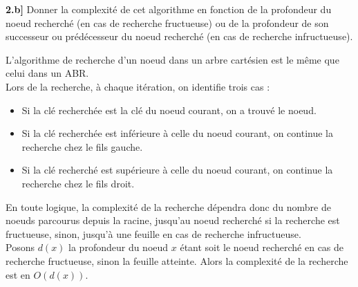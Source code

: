 \documentclass[a4paper,12pt]{report}
\begin{document}
\vspace{1.5cm}

\textbf{2.b]} Donner la complexité de cet algorithme en fonction de la profondeur du noeud recherché (en cas de recherche fructueuse) ou de la profondeur 
    de son successeur ou prédécesseur du noeud recherché (en cas de recherche infructueuse).



\begin{tcolorbox}[colback=gray!10, colframe=blue!30, coltitle=black, title=Réponse à la 2.b - 1/2]

    L'algorithme de recherche d'un noeud dans un arbre cartésien est le même que celui dans un ABR.\\

    Lors de la recherche, à chaque itération, on identifie trois cas :\\[-0.4cm]
    \begin{itemize}
        \item Si la clé recherchée est la clé du noeud courant, on a trouvé le noeud.
        \item Si la clé recherchée est inférieure à celle du noeud courant, on continue la recherche chez le fils gauche.
        \item Si la clé recherché est supérieure à celle du noeud courant, on continue la recherche chez le fils droit.
    \end{itemize}

    \vspace{0.5cm}

    En toute logique, la complexité de la recherche dépendra donc du nombre de noeuds parcourus depuis la racine, jusqu'au noeud recherché si la recherche 
        est fructueuse, sinon, jusqu'à une feuille en cas de recherche infructueuse.\\

    Posons \( d(x) \) la profondeur du noeud \( x \) étant soit le noeud recherché en cas de recherche fructueuse, sinon la feuille atteinte. Alors la 
        complexité de la recherche est en \( O(d(x)) \).\\

\end{tcolorbox}
\end{document}
